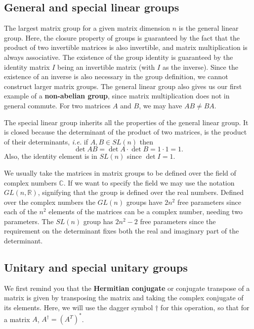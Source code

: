 \documentclass[notes.tex]{subfiles}
\begin{document}
\subsection{General and special linear groups}
The largest matrix group for a given matrix dimension $n$ is the general linear group.
Here, the closure property of groups is guaranteed by the fact that the product of two invertible matrices is also invertible, and matrix multiplication is always associative.
The existence of the group identity is guaranteed by the identity matrix $I$ being an invertible matrix (with $I$ as the inverse). Since the existence of an inverse is also necessary in the group definition, we cannot construct larger matrix groups. The general linear group also gives us our first example of a {\bf non-abelian group}, since matrix multiplication does not in general commute. For two matrices $A$ and $B$, we may have $AB\ne BA$.

The special linear group inherits all the properties of the general linear group. It is closed because the determinant of the product of two matrices, is the product of their determinants, {\it i.e.} if $A,B\in SL(n)$ then
\begin{equation*}
\det{AB}=\det{A}\cdot \det{B} =1 \cdot 1 = 1.
\end{equation*}
Also, the identity element is in $SL(n)$ since $\det{I}=1$.

We usually take the matrices in matrix groups to be defined over the field of complex numbers $\mathbb{C}$. If we want to specify the field we may use the notation $GL(n, \mathbb{R})$, signifying that the group is defined over the real numbers. Defined over the complex numbers the $GL(n)$ groups have $2n^2$ free parameters since each of the $n^2$ elements of the matrices can be a complex number, needing two parameters. The $SL(n)$ group has $2n^2-2$ free parameters since the requirement on the determinant fixes both the real and imaginary part of the determinant.

\subsection{Unitary and special unitary groups}
\label{sec:unitary_groups}
We first remind you that the {\bf Hermitian conjugate} or conjugate transpose of a matrix is given by transposing the matrix and taking the complex conjugate of its elements. Here, we will use the dagger symbol $\dagger$ for this operation, so that for a matrix $A$, $A^\dagger=(A^T)^*$.
\end{document}
